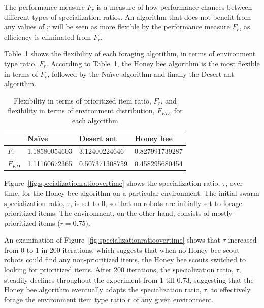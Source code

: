 The performance measure $F_r$ is a measure of how performance chances between different types of specialization ratios. An algorithm that does not benefit from any values of $r$ will be seen as more flexible by the performance measure $F_r$, as efficiency is eliminated from $F_r$.

Table~\ref{table:flexibility} shows the flexibility of each foraging algorithm, in terms of environment type ratio, $F_r$. According to Table~\ref{table:flexibility}, the Honey bee algorithm is the most flexible in terms of $F_r$, followed by the Na\"ive algorithm and finally the Desert ant algorithm. 

 
\begin{table}[]
\centering
\caption{Flexibility in terms of prioritized item ratio, $F_r$, and flexibility in terms of environment distribution, $F_{ED}$, for each algorithm}
\label{table:flexibility}
\begin{tabular}{@{}llll@{}}
\toprule
\textbf{}         & Na\"ive         & Desert ant        & Honey bee         \\ \midrule
\textbf{$F_r$}    & 1.18580054603 & 3.12400224646     & 0.827991739287    \\ \midrule
\textbf{$F_{ED}$} & 1.11160672365 & 0.507371308759 & 0.458295680454 
\end{tabular}
\end{table}



Figure~\ref{fig:specializationratioovertime} shows the specialization ratio, $\tau$, over time, for the Honey bee algorithm on a particular environment. The initial swarm specialization ratio, $\tau$, is set to 0, so that no robots are initially set to forage prioritized items. The environment, on the other hand, consists of mostly prioritized items ($r=0.75$). 

An examination of Figure~\ref{fig:specializationratioovertime} shows that $\tau$ increased from 0 to 1 in 200 iterations, which suggests that when no Honey bee scout robots could find any non-prioritized items, the Honey bee scouts switched to looking for prioritized items. After 200 iterations, the specialization ratio, $\tau$, steadily declines throughout the experiment from 1 till 0.73, suggesting that the Honey bee algorithm eventually adapts the specialization ratio, $\tau$, to effectively forage the environment item type ratio $r$ of any given environment.

